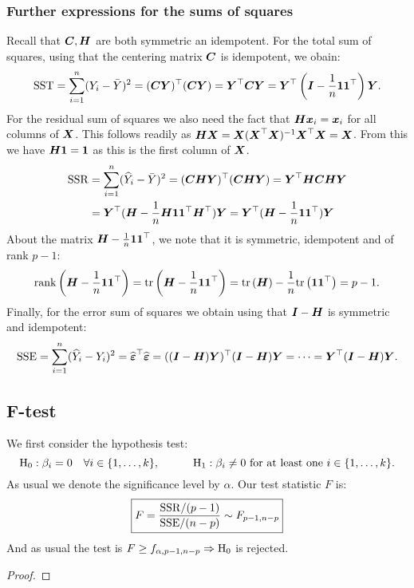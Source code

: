 \subsubsection{Further expressions for the sums of squares}
Recall that $\mC, \mH$ are both symmetric an idempotent. For the total sum of squares, using that the centering matrix $\mC$ is idempotent, we obain:
\begin{align*}
    \mr{SST} = \sum_{i=1}^n(Y_i-\bar{Y})^2 = (\mC\Y)^\top(\mC\Y) = \Y^\top \mC \Y = \Y^\top\brac{\mI-\frac{1}{n}\one\one^\top}\Y.
\end{align*}
For the residual sum of squares we also need the fact that $\mH\x_i=\x_i$ for all columns of $\X$. This follows readily as $\mH\X=\X(\X^\top\X)^{-1}\X^\top\X=\X$. From this we have $\mH\one = \one$ as this is the first column of $\X$. 
\begin{align*}
    \mr{SSR} 
    &= \sum_{i=1}^n(\hat{Y}_i-\bar{Y})^2 
    = (\mC\mH\Y)^\top(\mC\mH\Y) 
    = \Y^\top\mH\mC\mH\Y 
    \\&= \Y^\top(\mH-\frac{1}{n}\mH\one\one^\top\mH^\top)\Y 
    = \Y^\top(\mH-\frac{1}{n}\one\one^\top)\Y    
\end{align*}
About the matrix $\mH-\frac{1}{n}\one\one^\top$, we note that it is symmetric, idempotent and of rank $p-1$:
$$
    \rank{\mH-\frac{1}{n}\one\one^\top} = \tr{\mH-\frac{1}{n}\one\one^\top} = \tr{\mH}-\frac{1}{n}\tr{\one\one^\top}=p-1.
$$
Finally, for the error sum of squares we obtain using that $\mI-\mH$ is symmetric and idempotent:
$$
    \mr{SSE} = \sum_{i=1}^n(\hat{Y}_i-Y_i)^2 = \Eh^\top\Eh = ((\mI-\mH)\Y)^\top(\mI-\mH)\Y = \dots = \Y^\top(\mI-\mH)\Y.
$$
\subsection{F-test}
We first consider the hypothesis test:
$$
    \mr{H}_0 : \b_i = 0 \quad\forall i\in\{1,\dots,k\},
    \quad\quad\quad
    \mr{H}_1 : \b_i \ne 0 \textrm{ for at least one } i\in\{1,\dots,k\}.
$$
As usual we denote the significance level by $\alpha$. Our test statistic $F$ is:
\begin{align}
    \boxed{F = \frac{\mr{SSR}/(p-1)}{\mr{SSE}/(n-p)} \sim F_{p-1,n-p}}
\end{align}
And as usual the test is $F \geq f_{\alpha, p-1,n-p} \Rightarrow \mr{H}_0$ is rejected.
\begin{proof}
\end{proof}

